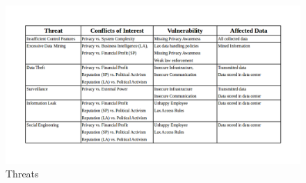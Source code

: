 \begin{figure}
\centering
\includegraphics[width=\textwidth]{diagrams/png/threat-table.png}
\caption{Threats}
\label{figure:Threats}
\end{figure}
